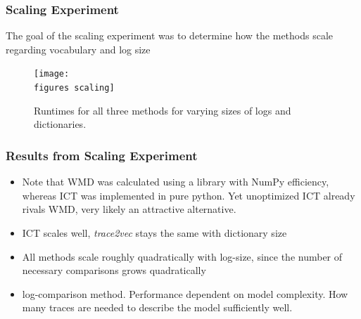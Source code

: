 \documentclass{beamer}
\newcommand{\figures}{../figures/}
\begin{document}
	
	\begin{frame}
		\frametitle{Scaling Experiment}
		The goal of the scaling experiment was to determine how the methods scale regarding vocabulary and log size
		\begin{figure}
			\texttt{[image: \\figures scaling]}
			\caption{Runtimes for all three methods for varying sizes of logs and dictionaries.}
			\label{fig:scalability}
		\end{figure}
	\end{frame}
	
	
	\begin{frame}
		\frametitle{Results from Scaling Experiment}
		\begin{itemize}
			\item Note that WMD was calculated using a library with NumPy efficiency, whereas ICT was implemented in pure python. Yet unoptimized ICT already rivals WMD, very likely an attractive alternative.
			\item ICT scales well, \emph{trace2vec} stays the same with dictionary size
			\item All methods scale roughly quadratically with log-size, since the number of necessary comparisons grows quadratically
			\item log-comparison method. Performance dependent on model complexity. How many traces are needed to describe the model sufficiently well.
		\end{itemize}
	\end{frame}
	
\end{document}

